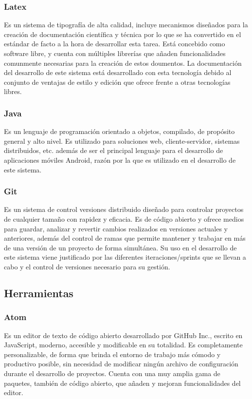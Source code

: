 \documentclass[12pt]{article}
\begin{document}
        \subsubsection{Latex} \label{sec:latex}
            Es un sistema de tipografía de alta calidad, incluye mecanismos diseñados para la creación de documentación científica y técnica por lo que se ha convertido en el estándar de facto a la hora de desarrollar esta tarea. Está concebido como software libre, y cuenta con múltiples librerías que añaden funcionalidades comunmente necesarias para la creación de estos doumentos. La documentación del desarrollo de este sistema está desarrollado con esta tecnología debido al conjunto de ventajas de estilo y edición que ofrece frente a otras tecnologías libres.

        \subsubsection{Java}
            Es un lenguaje de programación orientado a objetos, compilado, de propósito general y alto nivel. Es utilizado para soluciones web, cliente-servidor, sistemas distribuidos, etc. además de ser el principal lenguaje para el desarrollo de aplicaciones móviles Android, razón por la que es utilizado en el desarrollo de este sistema.

        \subsubsection{Git} \label{sec:git}
            Es un sistema de control versiones distribuido diseñado para controlar proyectos de cualquier tamaño con rapidez y eficacia. Es de código abierto y ofrece medios para guardar, analizar y revertir cambios realizados en versiones actuales y anteriores, además del control de ramas que permite mantener y trabajar en más de una versión de un proyecto de forma simultánea. Su uso en el desarrollo de este sistema viene justificado por las diferentes iteraciones/sprints que se llevan a cabo y el control de versiones necesario para su gestión.

    \subsection{Herramientas} 
        \subsubsection{Atom}
            Es un editor de texto de código abierto desarrollado por GitHub Inc., escrito en JavaScript, moderno, accesible y modificable en su totalidad. Es completamente personalizable, de forma que brinda el entorno de trabajo más cómodo y productivo posible, sin necesidad de modificar ningún archivo de configuración durante el desarrollo de proyectos. Cuenta con una muy amplia gama de paquetes, también de código abierto, que añaden y mejoran funcionalidades del editor.
\end{document}
